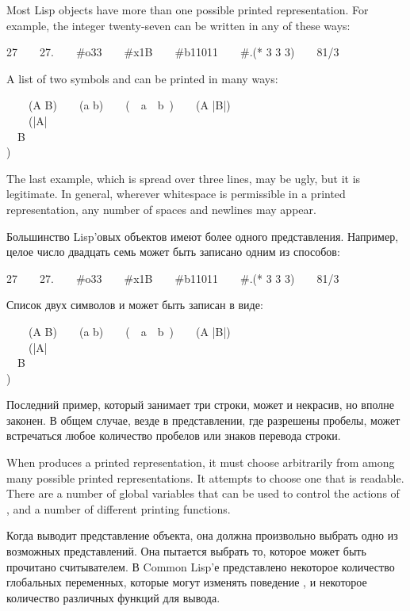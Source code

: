 Most Lisp objects have more than one possible printed representation.
For example, the integer twenty-seven can be written in any of these ways:
\begin{lisp}
27~~~~27.~~~~\#o33~~~~\#x1B~~~~\#b11011~~~~\#.(* 3 3 3)~~~~81/3
\end{lisp}
A list of two symbols  and  can be printed in many ways:
\begin{lisp}
~~~~(A B)~~~~(a b)~~~~(~~a~~b~)~~~~({\Xbackslash}A |B|) \\
~~~~(|{\Xbackslash}A| \\
~~B \\
)
\end{lisp}
The last example, which is spread over three lines, may be ugly, but it
is legitimate.  In general, wherever whitespace is permissible in a printed
representation, any number of spaces and newlines may appear.

Большинство Lisp'овых объектов имеют более одного представления. Например, целое
число двадцать семь может быть записано одним из способов:
\begin{lisp}
27~~~~27.~~~~\#o33~~~~\#x1B~~~~\#b11011~~~~\#.(* 3 3 3)~~~~81/3
\end{lisp}
Список двух символов  и  может быть записан в виде:
\begin{lisp}
~~~~(A B)~~~~(a b)~~~~(~~a~~b~)~~~~({\Xbackslash}A |B|) \\
~~~~(|{\Xbackslash}A| \\
~~B \\
)
\end{lisp}
Последний пример, который занимает три строки, может и некрасив, но вполне
законен. В общем случае, везде в представлении, где разрешены пробелы, может
встречаться любое количество пробелов или знаков перевода строки.

When  produces a printed representation, it must choose arbitrarily
from among many possible printed representations.  It attempts to choose
one that is readable.  There are a number of global variables that can
be used to control the actions of , and a number of different
printing functions.

Когда  выводит представление объекта, она должна произвольно выбрать
одно из возможных представлений. Она пытается выбрать то, которое может быть
прочитано считывателем. В Common Lisp'е представлено некоторое количество
глобальных переменных, которые могут изменять поведение , и некоторое
количество различных функций для вывода.


